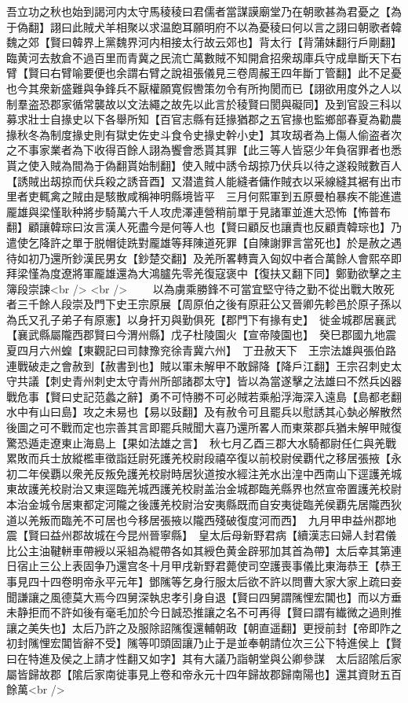 吾立功之秋也始到謁河内太守馬稜稜曰君儒者當謀謨廟堂乃在朝歌甚為君憂之【為于偽翻】詡曰此賊犬羊相聚以求温飽耳願明府不以為憂稜曰何以言之詡曰朝歌者韓魏之郊【賢曰韓界上黨魏界河内相接太行故云郊也】背太行【背蒲妹翻行戶剛翻】臨黄河去敖倉不過百里而青冀之民流亡萬數賊不知開倉招衆刼庫兵守成臯斷天下右臂【賢曰右臂喻要便也余謂右臂之說祖張儀見三卷周赧王四年斷丁管翻】此不足憂也今其衆新盛難與争鋒兵不厭權願寛假轡策勿令有所拘閡而已【詡欲用度外之人以制羣盗恐郡家循常襲故以文法繩之故先以此言於稜賢曰閡與礙同】及到官設三科以募求壯士自掾史以下各舉所知【百官志縣有廷掾猶郡之五官掾也監鄉部春夏為勸農掾秋冬為制度掾史則有獄史佐史斗食令史掾史幹小史】其攻刼者為上傷人偷盗者次之不事家業者為下收得百餘人詡為饗會悉貰其罪【此三等人皆惡少年負宿罪者也悉貰之使入賊為間為于偽翻貰始制翻】使入賊中誘令刼掠乃伏兵以待之遂殺賊數百人【誘賊出刼掠而伏兵殺之誘音酉】又潜遣貧人能縫者傭作賊衣以采線縫其裾有出市里者吏輒禽之賊由是駭散咸稱神明縣境皆平　三月何熙軍到五原曼柏暴疾不能進遣龎雄與梁慬耿种將步騎萬六千人攻虎澤連營稍前單于見諸軍並進大恐怖【怖普布翻】顧讓韓琮曰汝言漢人死盡今是何等人也【賢曰顧反也讓責也反顧責韓琮也】乃遣使乞降許之單于脱帽徒跣對龎雄等拜陳道死罪【自陳謝罪言當死也】於是赦之遇待如初乃還所鈔漢民男女【鈔楚交翻】及羌所畧轉賣入匈奴中者合萬餘人會熙卒即拜梁慬為度遼將軍龎雄還為大鴻臚先零羌復寇褒中【復扶又翻下同】鄭勤欲擊之主簿段崇諫<br />
<br />
　　以為虜乘勝鋒不可當宜堅守待之勤不從出戰大敗死者三千餘人段崇及門下史王宗原展【周原伯之後有原莊公又晉卿先軫邑於原子孫以為氏又孔子弟子有原憲】以身扞刃與勤俱死【郡門下有掾有史】　徙金城郡居襄武【襄武縣屬隴西郡賢曰今渭州縣】戊子杜陵園火【宣帝陵園也】　癸巳郡國九地震　夏四月六州蝗【東觀記曰司隸豫兖徐青冀六州】　丁丑赦天下　王宗法雄與張伯路連戰破走之會赦到【赦書到也】賊以軍未解甲不敢歸降【降戶江翻】王宗召刺史太守共議【刺史青州刺史太守青州所部諸郡太守】皆以為當遂擊之法雄曰不然兵凶器戰危事【賢曰史記范蠡之辭】勇不可恃勝不可必賊若乘船浮海深入遠島【島都老翻水中有山曰島】攻之未易也【易以䜴翻】及有赦令可且罷兵以慰誘其心埶必解散然後圖之可不戰而定也宗善其言即罷兵賊聞大喜乃還所畧人而東萊郡兵猶未解甲賊復驚恐遁走遼東止海島上【果如法雄之言】　秋七月乙酉三郡大水騎都尉任仁與羌戰累敗而兵士放縱檻車徵詣廷尉死護羌校尉段禧卒復以前校尉侯覇代之移居張掖【永初二年侯覇以衆羌反叛免護羌校尉時居狄道按水經注羌水出湟中西南山下逕護羌城東故護羌校尉治又東逕臨羌城西護羌校尉盖治金城郡臨羌縣界也然宣帝置護羌校尉本治金城令居東都定河隴之後護羌校尉治安夷縣既而自安夷徙臨羌侯覇先居隴西狄道以羌叛而臨羌不可居也今移居張掖以隴西殘破復度河而西】　九月甲申益州郡地震【賢曰益州郡故城在今昆州晉寧縣】　皇太后母新野君病【續漢志曰婦人封君儀比公主油鞬軿車帶綬以采組為緄帶各如其綬色黄金辟邪加其首為帶】太后幸其第連日宿止三公上表固争乃還宫冬十月甲戌新野君薨使司空護喪事儀比東海恭王【恭王事見四十四卷明帝永平元年】鄧隲等乞身行服太后欲不許以問曹大家大家上疏曰妾聞謙讓之風德莫大焉今四舅深執忠孝引身自退【賢曰四舅謂隲悝宏閶也】而以方垂未静拒而不許如後有毫毛加於今日誠恐推讓之名不可再得【賢曰謂有纎微之過則推讓之美失也】太后乃許之及服除詔隲復還輔朝政【朝直遥翻】更授前封【帝即阼之初封隲悝宏閶皆辭不受】隲等叩頭固讓乃止于是並奉朝請位次三公下特進侯上【賢曰在特進及侯之上請才性翻又如字】其有大議乃詣朝堂與公卿參謀　太后詔隂后家屬皆歸故郡【隂后家南徙事見上卷和帝永元十四年歸故郡歸南陽也】還其資財五百餘萬<br />
